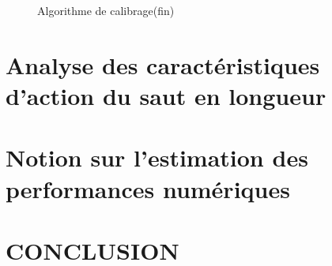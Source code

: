  \begin{figure}[H]%
 	\center%
 	\setlength{\fboxsep}{5pt}%
 	\setlength{\fboxrule}{0.5pt}%
 	\caption[Algorithme de calibrage(fin)]{Algorithme de calibrage(fin)}
 	\label{fig:Algorithme2}
 \end{figure}
 
 
 
 
 
 
 
 
 
 
 
 
 
 
 
 
 
 
 
 
 
 
 
 
 
 
 
 
 
 \newpage
\section{Analyse des caractéristiques d’action du saut en longueur}
\newpage
\section{Notion sur l'estimation des performances numériques}
\newpage
\section{CONCLUSION}
 